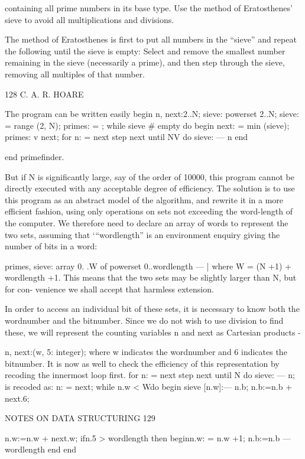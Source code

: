 {{{{				containing all prime numbers in its base type. Use the method of Eratosthenes’ sieve to avoid all multiplications and divisions.
				
				The method of Eratosthenes is first to put all numbers in the “sieve” and repeat the following until the sieve is empty: Select and remove the smallest number remaining in the sieve (necessarily a prime), and then step through the sieve, removing all multiples of that number.
				
				128 C. A. R. HOARE
				
				The program can be written easily begin n, next:2..N; sieve: powerset 2..N; sieve: = range (2, N); primes: = { }; while sieve # empty do begin next: = min (sieve); primes: v {next}; for n: = next step next until NV do sieve: — {n} end
				
				end primefinder.
				
				But if N is significantly large, say of the order of 10000, this program cannot be directly executed with any acceptable degree of efficiency. The solution is to use this program as an abstract model of the algorithm, and rewrite it in a more efficient fashion, using only operations on sets not exceeding the word-length of the computer. We therefore need to declare an array of words to represent the two sets, assuming that ‘“wordlength” is an environment enquiry giving the number of bits in a word:
				
				primes, sieve: array 0. .W of powerset 0..wordlength — | where W = (N +1) + wordlength +1. This means that the two sets may be slightly larger than N, but for con- venience we shall accept that harmless extension.
				
				In order to access an individual bit of these sets, it is necessary to know both the wordnumber and the bitnumber. Since we do not wish to use division to find these, we will represent the counting variables n and next as Cartesian products -
				
				n, next:(w, 5: integer); where w indicates the wordnumber and 6 indicates the bitnumber. It is now as well to check the efficiency of this representation by recoding the innermost loop first. for n: = next step next until N do sieve: — {n}; is recoded as: n: = next; while n.w < Wdo begin sieve [n.w]:— {n.b}; n.b:=n.b + next.6;
				
				NOTES ON DATA STRUCTURING 129
				
				n.w:=n.w + next.w; ifn.5 > wordlength then beginn.w: = n.w +1; n.b:=n.b — wordlength end end
				
}}}}
